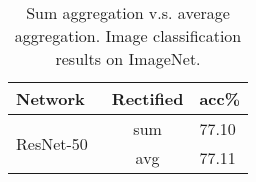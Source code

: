 \begin{table}
    \begin{center}
        \begin{tabular} {l | c | l  }
            \toprule[1pt]
            {\bf Network} & {\bf Rectified} & {\bf acc\%} \\ 
            \hline
            \multirow{2}{*}{ResNet-50~\cite{he2015deep}} & sum & 77.10  \\
             & avg & 77.11 \\
            \bottomrule[1pt]
        \end{tabular}
    \end{center}   
\caption{Sum aggregation v.s. average aggregation. Image classification results on ImageNet. }
\label{tab:sumavg}
\end{table}

